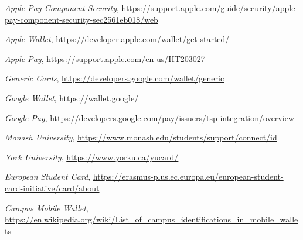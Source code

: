 \documentclass{article}
\begin{document}
\begin{thebibliography}{9}
    \textit{Apple Pay Component Security},
    \url{https://support.apple.com/guide/security/apple-pay-component-security-sec2561eb018/web}

    \textit{Apple Wallet},
    \url{https://developer.apple.com/wallet/get-started/}

    \textit{Apple Pay},
    \url{https://support.apple.com/en-us/HT203027}

    \textit{Generic Cards},
    \url{https://developers.google.com/wallet/generic}

    \textit{Google Wallet},
    \url{https://wallet.google/}

    \textit{Google Pay},
    \url{https://developers.google.com/pay/issuers/tsp-integration/overview}

    \textit{Monash University},
    \url{https://www.monash.edu/students/support/connect/id}

    \textit{York University},
    \url{https://www.yorku.ca/yucard/}

    \textit{European Student Card},
    \url{https://erasmus-plus.ec.europa.eu/european-student-card-initiative/card/about}

    \textit{Campus Mobile Wallet},
    \url{https://en.wikipedia.org/wiki/List_of_campus_identifications_in_mobile_wallets}

\end{thebibliography}
\end{document}
